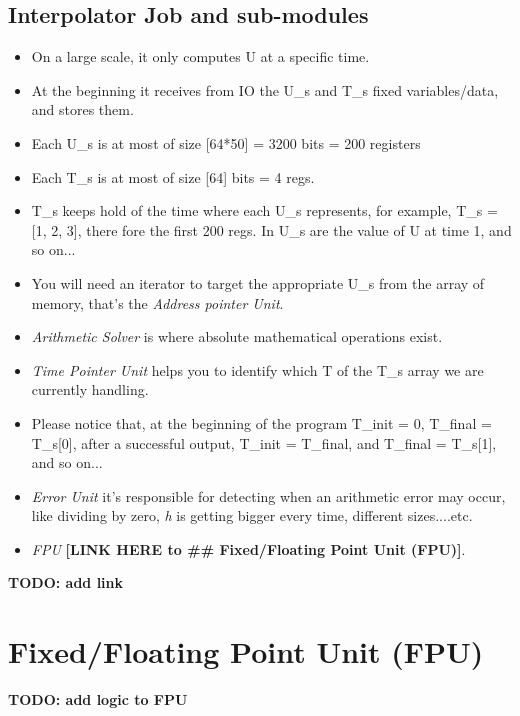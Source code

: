 \documentclass[12pt]{report}
\begin{document}
\subsection{Interpolator Job and sub-modules}
\begin{itemize}
    \item On a large scale, it only computes U at a specific time.
    \item At the beginning it receives from IO the U\_s and T\_s fixed variables/data, and stores them.
    \item Each U\_s is at most of size [64*50] = 3200 bits = 200 registers
    \item Each T\_s is at most of size [64] bits = 4 regs.
    \item T\_s keeps hold of the time where each U\_s represents, for example, T\_s = [1, 2, 3], there fore the first 200 regs. In U\_s are the value of U at time 1, and so on... 
    \item You will need an iterator to target the appropriate U\_s from the array of memory, that's the \emph{Address pointer Unit}.
    \item \emph{Arithmetic Solver} is where absolute mathematical operations exist.
    \item \emph{Time Pointer Unit} helps you to identify which T of the T\_s array we are currently handling.
    \item Please notice that, at the beginning of the program T\_init = 0, T\_final = T\_s[0], after a successful output, T\_init = T\_final, and T\_final = T\_s[1], and so on...
    \item \emph{Error Unit} it's responsible for detecting when an arithmetic error may occur, like dividing by zero, \emph{h} is getting bigger every time, different sizes....etc.
    \item \emph{FPU} \textbf{[LINK HERE to \#\# Fixed/Floating Point Unit (FPU)]}.
\end{itemize}

\textbf{TODO: add link}

\section{Fixed/Floating Point Unit (FPU)}

\textbf{TODO: add logic to FPU}
\end{document}
